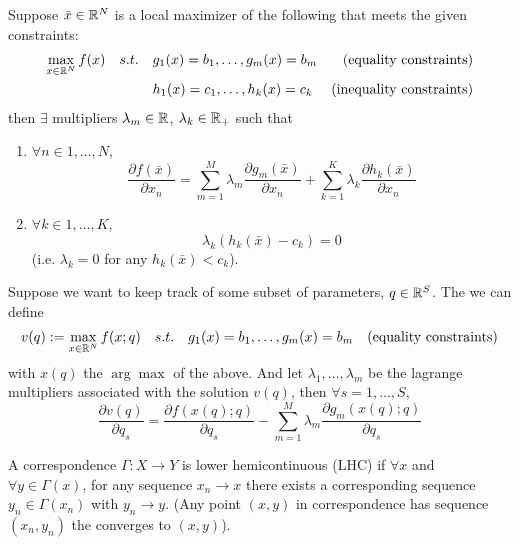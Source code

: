 
\begin{theorem}
  Suppose $\bar x \in {\mathbb R}^N$ is a local maximizer of the following that
  meets the given constraints:
  \begin{align}
    \max_{x \in {\mathbb R}^N} f(x) \quad s.t. \quad 
    & g_1(x) = b_1, \dots, g_m(x) = b_m & \text{(equality constraints)} \notag \\
    & h_1(x) = c_1, \dots, h_k(x) = c_k & \text{(inequality constraints)} \notag
  \end{align}
  then $\exists$ multipliers $\lambda_m \in {\mathbb R}$, $\lambda_k \in {\mathbb R}_+$
  such that
  \begin{enumerate}[(1)]
  \item $\forall n \in 1, \dots, N$,
    \[
    \frac{\partial f(\bar x)}{\partial x_n} 
    = \sum_{m=1}^M \lambda_m \frac{\partial g_m(\bar x)}{\partial x_n}
    + \sum_{k=1}^K \lambda_k \frac{\partial h_k(\bar x)}{\partial x_n}
    \]

  \item $\forall k \in 1, \dots, K$,
    \[
    \lambda_k(h_k(\bar x) - c_k) = 0
    \]
    (i.e. $\lambda_k = 0$ for any $h_k(\bar x) < c_k$).
  \end{enumerate}
\end{theorem}

\begin{theorem}[Envelope]
  Suppose we want to keep track of some subset of parameters, $q \in
  {\mathbb R}^S$. The we can define
  \begin{align}
    v(q) := \max_{x \in {\mathbb R}^N} f(x; q) \quad s.t. \quad 
    & g_1(x) = b_1, \dots, g_m(x) = b_m & \text{(equality constraints)} \notag
  \end{align}
  with $x(q)$ the $\arg \max$ of the above. And let $\lambda_1, \dots,
  \lambda_m$ be the lagrange multipliers associated with the solution
  $v(q)$, then $\forall s = 1, \dots, S$,
  \[
  \frac{\partial v(q)}{\partial q_s} 
  = \frac{\partial f(x(q); q)}{\partial q_s}
  - \sum_{m=1}^M \lambda_m \frac{\partial g_m(x(q); q)}{\partial q_s}
  \]

\end{theorem}

\begin{definition}[LHC]
  A correspondence $\Gamma:X \to Y$ is lower hemicontinuous (LHC) if
  $\forall x$ and $\forall y \in \Gamma(x)$, for any sequence $x_n \to
  x$ there exists a corresponding sequence $y_n \in \Gamma(x_n)$ with
  $y_n \to y$. (Any point $(x,y)$ in correspondence has sequence
  $(x_n, y_n)$ the converges to $(x,y)$). 
\end{definition}


